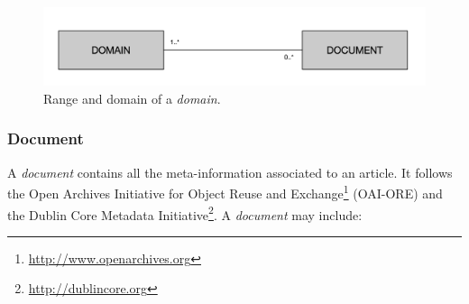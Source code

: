 \begin{figure}
  \center
  \includegraphics[scale=0.45]{model-domain}
  \caption{Range and domain of a \textit{domain}.}
  \label{fig:librairy-model-domain}
\end{figure}

\subsubsection{Document}

A \textit{document} contains all the meta-information associated to an article. It follows the Open Archives Initiative for Object Reuse and Exchange\footnote{\url{http://www.openarchives.org}} (OAI-ORE) and the Dublin Core Metadata Initiative\footnote{\url{http://dublincore.org}}. A \textit{document} may include:                                                              

